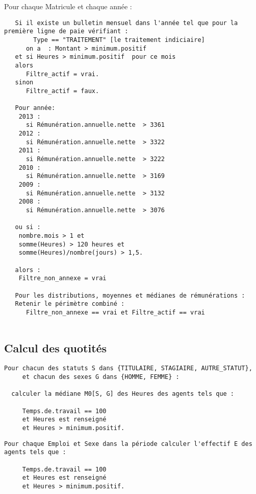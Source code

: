 \documentclass[]{article}
\begin{document}
Pour chaque Matricule et chaque année :

\begin{verbatim}
   Si il existe un bulletin mensuel dans l'année tel que pour la première ligne de paie vérifiant :
        Type == "TRAITEMENT" [le traitement indiciaire]  
      on a  : Montant > minimum.positif  
   et si Heures > minimum.positif  pour ce mois
   alors   
      Filtre_actif = vrai.  
   sinon  
      Filtre_actif = faux.  
      
   Pour année:
    2013 :
      si Rémunération.annuelle.nette  > 3361
    2012 :
      si Rémunération.annuelle.nette  > 3322
    2011 :
      si Rémunération.annuelle.nette  > 3222
    2010 :
      si Rémunération.annuelle.nette  > 3169
    2009 :
      si Rémunération.annuelle.nette  > 3132
    2008 :
      si Rémunération.annuelle.nette  > 3076  
      
   ou si :
    nombre.mois > 1 et   
    somme(Heures) > 120 heures et  
    somme(Heures)/nombre(jours) > 1,5.   
   
   alors :
    Filtre_non_annexe = vrai
    
   Pour les distributions, moyennes et médianes de rémunérations :   
   Retenir le périmètre combiné : 
      Filtre_non_annexe == vrai et Filtre_actif == vrai
    
\end{verbatim}

\subsection{Calcul des quotités}\label{calcul-des-quotites}

\begin{verbatim}
Pour chacun des statuts S dans {TITULAIRE, STAGIAIRE, AUTRE_STATUT},    
     et chacun des sexes G dans {HOMME, FEMME} :  

  calculer la médiane M0[S, G] des Heures des agents tels que :  
  
     Temps.de.travail == 100   
     et Heures est renseigné   
     et Heures > minimum.positif.  
\end{verbatim}

\begin{verbatim}
Pour chaque Emploi et Sexe dans la période calculer l'effectif E des agents tels que :
   
     Temps.de.travail == 100   
     et Heures est renseigné   
     et Heures > minimum.positif.  
\end{verbatim}
\end{document}
